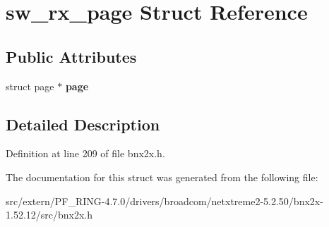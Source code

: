 \hypertarget{structsw__rx__page}{
\section{sw\_\-rx\_\-page Struct Reference}
\label{structsw__rx__page}
}
\subsection*{Public Attributes}
\begin{DoxyCompactItemize}
\item 
\hypertarget{structsw__rx__page_aeaa887520d24ca031edfb3dc718e5439}{
struct page $\ast$ {\bfseries page}}
\label{structsw__rx__page_aeaa887520d24ca031edfb3dc718e5439}

\end{DoxyCompactItemize}


\subsection{Detailed Description}


Definition at line 209 of file bnx2x.h.



The documentation for this struct was generated from the following file:\begin{DoxyCompactItemize}
\item 
src/extern/PF\_\-RING-\/4.7.0/drivers/broadcom/netxtreme2-\/5.2.50/bnx2x-\/1.52.12/src/bnx2x.h\end{DoxyCompactItemize}
